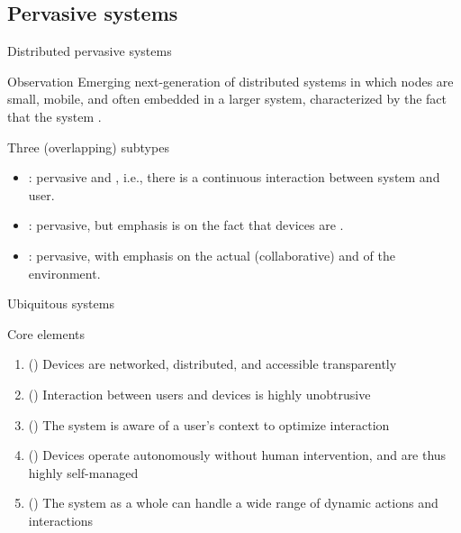 \subsection{Pervasive systems}
\begin{slide}{Distributed pervasive systems}
  \begin{block}{Observation} 
    Emerging next-generation of distributed systems in which nodes are small, mobile, and often embedded in a
    larger system, characterized by the fact that the system .
  \end{block}
  \begin{block}{Three (overlapping) subtypes}
    \begin{itemize}
    \item<2-> : pervasive and , i.e., there is a
      continuous interaction between system and user.
    \item<3-> : pervasive, but emphasis is on the fact that devices are
      . 
    \item<4-> : pervasive, with emphasis on the actual (collaborative)
       and  of the environment.
    \end{itemize}
  \end{block}
\end{slide}
\begin{slide}{Ubiquitous systems}
  \begin{block}{Core elements}
    \begin{enumerate}\tightlist
    \item () Devices are networked, distributed, and accessible transparently
    \item () Interaction between users and devices is highly unobtrusive
    \item () The system is aware of a user's context to optimize interaction
    \item () Devices operate autonomously without human intervention, and are thus highly self-managed
    \item () The system as a whole can handle a wide range of dynamic actions and interactions
    \end{enumerate}
  \end{block}
\end{slide}
